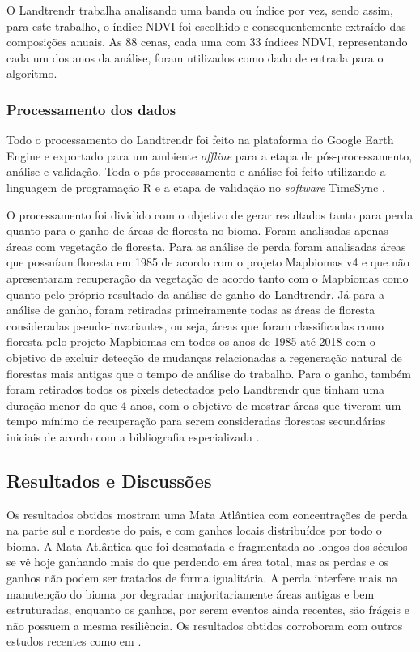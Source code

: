 O Landtrendr trabalha analisando uma banda ou índice por vez, sendo assim, para este trabalho, o índice NDVI foi escolhido e consequentemente extraído das composições anuais. As 88 cenas, cada uma com 33 índices NDVI, representando cada um dos anos da análise, foram utilizados como dado de entrada para o algoritmo. 

\subsubsection{Processamento dos dados}
\hspace{13pt} Todo o processamento do Landtrendr foi feito na plataforma do Google Earth Engine e exportado para um ambiente \textit{offline} para a etapa de pós-processamento, análise e validação. Toda o pós-processamento e análise foi feito utilizando a linguagem de programação R e a etapa de validação no \textit{software} TimeSync \citep{COHEN20102911}.

O processamento foi dividido com o objetivo de gerar resultados tanto para perda quanto para o ganho de áreas de floresta no bioma. Foram analisadas apenas áreas com vegetação de floresta. Para as análise de perda foram analisadas áreas que possuíam floresta em 1985 de acordo com o projeto Mapbiomas \citep{Souza2019} v4 e que não apresentaram recuperação da vegetação de acordo tanto com o Mapbiomas como quanto pelo próprio resultado da análise de ganho do Landtrendr. Já para a análise de ganho, foram retiradas primeiramente todas as áreas de floresta consideradas pseudo-invariantes, ou seja, áreas que foram classificadas como floresta pelo projeto Mapbiomas em todos os anos de 1985 até 2018 com o objetivo de excluir detecção de mudanças relacionadas a regeneração natural de florestas mais antigas que o tempo de análise do trabalho. Para o ganho, também foram retirados todos os pixels detectados pelo Landtrendr que tinham uma duração menor do que 4 anos, com o objetivo de mostrar áreas que tiveram um tempo mínimo de recuperação para serem consideradas florestas secundárias iniciais de acordo com a bibliografia especializada \citep{Chazdon2014}.

\subsection{Resultados e Discussões}
\hspace{13pt} Os resultados obtidos mostram uma Mata Atlântica com concentrações de perda na parte sul e nordeste do pais, e com ganhos locais distribuídos por todo o bioma. A Mata Atlântica que foi desmatada e fragmentada ao longos dos séculos se vê hoje ganhando mais do que perdendo em área total, mas as perdas e os ganhos não podem ser tratados de forma igualitária. A perda interfere mais na manutenção do bioma por degradar majoritariamente áreas antigas e bem estruturadas, enquanto os ganhos, por serem eventos ainda recentes, são frágeis e não possuem a mesma resiliência. Os resultados obtidos corroboram com outros estudos recentes como em \citep{Rosa2021, CROUZEILLES2019, REZENDE2018208}.  

